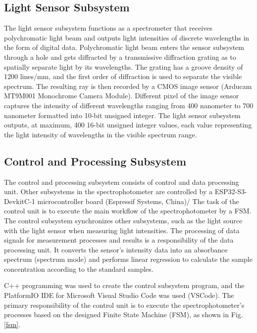 \documentclass[conference]{IEEEtran}
\begin{document}
\subsection{Light Sensor Subsystem}
The light sensor subsystem functions as a spectrometer that receives polychromatic light beam and outputs light intensities of discrete wavelengths in the form of digital data.
Polychromatic light beam enters the sensor subsystem through a hole and gets diffracted by a transmissive diffraction grating as to spatially separate light by its wavelengths.
The grating has a groove density of 1200 lines/mm, and the first order of diffraction is used to separate the visible spectrum.
The resulting ray is then recorded by a CMOS image sensor (Arducam MT9M001 Monochrome Camera Module).
Different pixel of the image sensor captures the intensity of different wavelengths ranging from 400 nanometer to 700 nanometer formatted into 10-bit unsigned integer.
The light sensor subsystem outputs, at maximum, 400 16-bit unsigned integer values, each value representing the light intensity of wavelengths in the visible spectrum range. 

\subsection{Control and Processing Subsystem}
The control and processing subsystem consists of control and data processing unit.
Other subsystems in the spectrophotometer are controlled by a ESP32-S3-DevkitC-1 microcontroller board (Espressif Systems, China)/
The task of the control unit is to execute the main workflow of the spectrophotometer by a FSM.
The control subsystem synchronizes other subsystems, such as the light source with the light sensor when measuring light intensities.
The processing of data signals for measurement processes and results is a responsibility of the data processing unit.
It converts the sensor's intensity data into an absorbance spectrum (spectrum mode) and performs linear regression to calculate the sample concentration according to the standard samples.

C++ programming was used to create the control subsystem program, and the PlatformIO IDE for Microsoft Visual Studio Code was used (VSCode).
The primary responsibility of the control unit is to execute the spectrophotometer's processes based on the designed Finite State Machine (FSM), as shown in Fig. \ref{fsm}.
\end{document}

